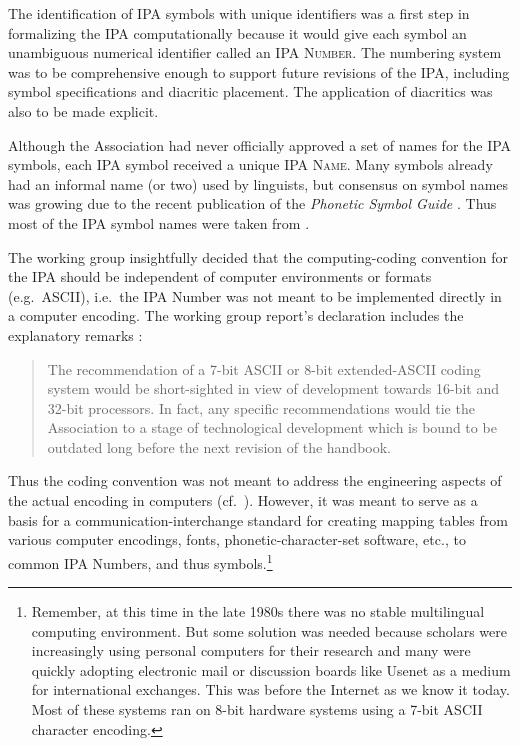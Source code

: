 \noindent The identification of IPA symbols with unique identifiers was 
a first step in formalizing the IPA computationally because it would give 
each symbol an unambiguous numerical identifier called an \textsc{IPA Number}. 
The numbering system was to be comprehensive enough to support future revisions 
of the IPA, including symbol specifications and diacritic placement. The 
application of diacritics was also to be made explicit. 

Although the Association had never officially approved a set of names 
for the IPA symbols, each IPA symbol received a unique \textsc{IPA Name}. 
Many symbols already had an informal name (or two) used by linguists, but 
consensus on symbol names was growing due to the recent publication of the 
\textit{Phonetic Symbol Guide} \citep{PullumLadusaw1986}. Thus most of the 
IPA symbol names were taken from \cite{PullumLadusaw1986} \citep[31]{IPA1999}.

The working group insightfully decided that the computing-coding convention 
for the IPA should be independent of computer environments or formats (e.g.\ ASCII), 
i.e.\ the IPA Number was not meant to be implemented directly in a computer 
encoding. The working group report's declaration includes the explanatory 
remarks \citep[82]{International1989report}:

\begin{quote}
The recommendation of a 7-bit ASCII or 8-bit extended-ASCII coding system 
would be short-sighted in view of development towards 16-bit and 32-bit 
processors. In fact, any specific recommendations would tie the Association 
to a stage of technological development which is bound to be outdated long 
before the next revision of the handbook.
\end{quote}

\noindent Thus the coding convention was not meant to address the engineering 
aspects of the actual encoding in computers (cf.\ \cite{Anderson1984}). However, 
it was meant to serve as a basis for a communication-interchange standard for 
creating mapping tables from various computer encodings, fonts, phonetic-character-set 
software, etc., to common IPA Numbers, and thus symbols.\footnote{Remember, at 
this time in the late 1980s there was no stable multilingual computing environment. 
But some solution was needed because scholars were increasingly using personal 
computers for their research and many were quickly adopting electronic mail or 
discussion boards like Usenet as a medium for international exchanges. This was 
before the Internet as we know it today. Most of these systems ran on 8-bit 
hardware systems using a 7-bit ASCII character encoding.}

